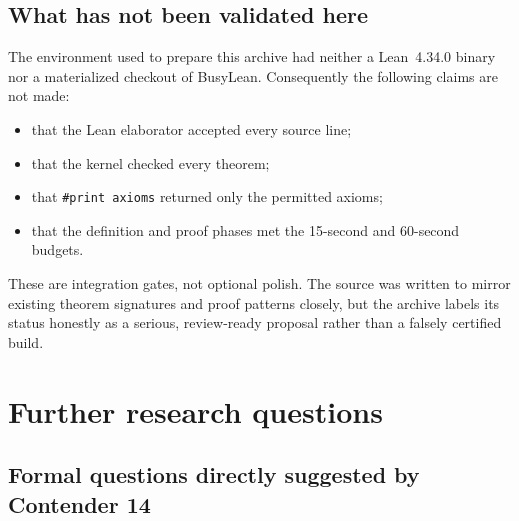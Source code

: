\documentclass[11pt]{article}
\theoremstyle{definition}
\theoremstyle{remark}
\newcommand{\lean}[1]{\texttt{#1}}
\begin{document}
\subsection{What has not been validated here}

The environment used to prepare this archive had neither a Lean~4.34.0 binary
nor a materialized checkout of BusyLean.  Consequently the following claims
are not made:

\begin{itemize}[leftmargin=*]
\item that the Lean elaborator accepted every source line;
\item that the kernel checked every theorem;
\item that \lean{\#print axioms} returned only the permitted axioms;
\item that the definition and proof phases met the 15-second and 60-second
  budgets.
\end{itemize}

These are integration gates, not optional polish.  The source was written to
mirror existing theorem signatures and proof patterns closely, but the archive
labels its status honestly as a serious, review-ready proposal rather than a
falsely certified build.

\section{Further research questions}

\subsection{Formal questions directly suggested by Contender 14}
\end{document}
